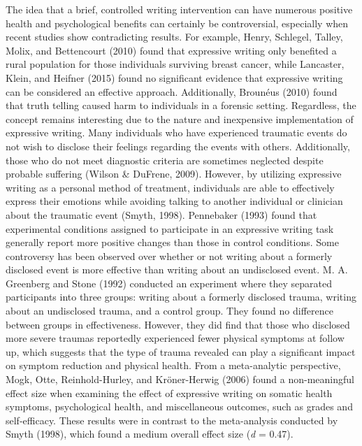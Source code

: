 \documentclass[english,man]{apa6}
\theoremstyle{definition}
\theoremstyle{definition}
\theoremstyle{definition}
\theoremstyle{remark}
\begin{document}
The idea that a brief, controlled writing intervention can have numerous
positive health and psychological benefits can certainly be
controversial, especially when recent studies show contradicting
results. For example, Henry, Schlegel, Talley, Molix, and Bettencourt
(2010) found that expressive writing only benefited a rural population
for those individuals surviving breast cancer, while Lancaster, Klein,
and Heifner (2015) found no significant evidence that expressive writing
can be considered an effective approach. Additionally, Brounéus (2010)
found that truth telling caused harm to individuals in a forensic
setting. Regardless, the concept remains interesting due to the nature
and inexpensive implementation of expressive writing. Many individuals
who have experienced traumatic events do not wish to disclose their
feelings regarding the events with others. Additionally, those who do
not meet diagnostic criteria are sometimes neglected despite probable
suffering (Wilson \& DuFrene, 2009). However, by utilizing expressive
writing as a personal method of treatment, individuals are able to
effectively express their emotions while avoiding talking to another
individual or clinician about the traumatic event (Smyth, 1998).
Pennebaker (1993) found that experimental conditions assigned to
participate in an expressive writing task generally report more positive
changes than those in control conditions. Some controversy has been
observed over whether or not writing about a formerly disclosed event is
more effective than writing about an undisclosed event. M. A. Greenberg
and Stone (1992) conducted an experiment where they separated
participants into three groups: writing about a formerly disclosed
trauma, writing about an undisclosed trauma, and a control group. They
found no difference between groups in effectiveness. However, they did
find that those who disclosed more severe traumas reportedly experienced
fewer physical symptoms at follow up, which suggests that the type of
trauma revealed can play a significant impact on symptom reduction and
physical health. From a meta-analytic perspective, Mogk, Otte,
Reinhold-Hurley, and Kröner-Herwig (2006) found a non-meaningful effect
size when examining the effect of expressive writing on somatic health
symptoms, psychological health, and miscellaneous outcomes, such as
grades and self-efficacy. These results were in contrast to the
meta-analysis conducted by Smyth (1998), which found a medium overall
effect size (\emph{d} = 0.47).
\end{document}
